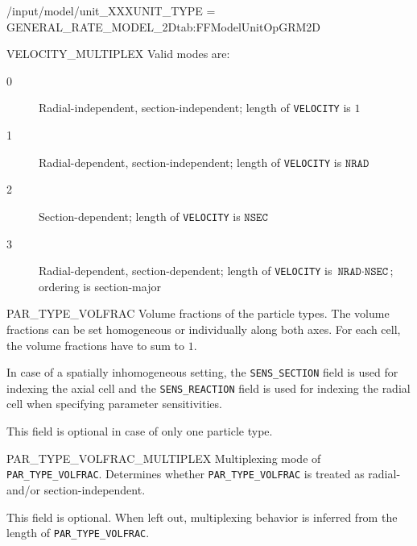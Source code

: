 \begin{condsubgroup}{/input/model/unit\_XXX}{UNIT\_TYPE = GENERAL\_RATE\_MODEL\_2D}{tab:FFModelUnitOpGRM2D}
\begin{dataset}[unit=--,type=int,range={$\{0, \dots, 3 \}$},length={1}]{VELOCITY\_MULTIPLEX}
    Valid modes are:
    \begin{description}
      \item[0] Radial-independent, section-independent; length of \texttt{VELOCITY} is $1$
      \item[1] Radial-dependent, section-independent; length of \texttt{VELOCITY} is $\texttt{NRAD}$
      \item[2] Section-dependent; length of \texttt{VELOCITY} is $\texttt{NSEC}$
      \item[3] Radial-dependent, section-dependent; length of \texttt{VELOCITY} is $\texttt{NRAD} \cdot \texttt{NSEC}$; ordering is section-major
    \end{description}\vspace{-\baselineskip}
  \end{dataset}
  \begin{dataset}[unit=--,type=double,range={$[0,1]$},length={see \texttt{PAR\_TYPE\_VOLFRAC\_MULTIPLEX}}]{PAR\_TYPE\_VOLFRAC}
    Volume fractions of the particle types.
    The volume fractions can be set homogeneous or individually along both axes.
    For each cell, the volume fractions have to sum to $1$.

    In case of a spatially inhomogeneous setting, the \texttt{SENS\_SECTION} field is used for indexing the axial cell and the \texttt{SENS\_REACTION} field is used for indexing the radial cell when specifying parameter sensitivities.

    This field is optional in case of only one particle type.
  \end{dataset}
  \begin{dataset}[unit=--,type=int,range={$\{0, \dots, 3 \}$},length={1}]{PAR\_TYPE\_VOLFRAC\_MULTIPLEX}
    Multiplexing mode of \texttt{PAR\_TYPE\_VOLFRAC}.
    Determines whether \texttt{PAR\_TYPE\_VOLFRAC} is treated as radial- and/or section-independent.

    This field is optional.
    When left out, multiplexing behavior is inferred from the length of \texttt{PAR\_TYPE\_VOLFRAC}.


\end{dataset}
\end{condsubgroup}
